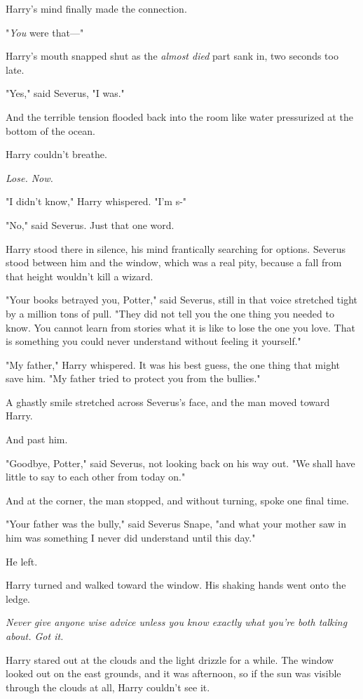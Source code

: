 Harry's mind finally made the connection.

"\emph{You} were that---"

Harry's mouth snapped shut as the \emph{almost died} part sank in, two seconds 
too late.

"Yes," said Severus, "I was."

And the terrible tension flooded back into the room like water pressurized at 
the bottom of the ocean.

Harry couldn't breathe.

\emph{Lose. Now.}

"I didn't know," Harry whispered. "I'm s-"

"No," said Severus. Just that one word.

Harry stood there in silence, his mind frantically searching for options. 
Severus stood between him and the window, which was a real pity, because a fall 
from that height wouldn't kill a wizard.

"Your books betrayed you, Potter," said Severus, still in that voice stretched 
tight by a million tons of pull. "They did not tell you the one thing you 
needed to know. You cannot learn from stories what it is like to lose the one 
you love. That is something you could never understand without feeling it 
yourself."

"My father," Harry whispered. It was his best guess, the one thing that might 
save him. "My father tried to protect you from the bullies."

A ghastly smile stretched across Severus's face, and the man moved toward Harry.

And past him.

"Goodbye, Potter," said Severus, not looking back on his way out. "We shall 
have little to say to each other from today on."

And at the corner, the man stopped, and without turning, spoke one final time.

"Your father was the bully," said Severus Snape, "and what your mother saw in 
him was something I never did understand until this day."

He left.

Harry turned and walked toward the window. His shaking hands went onto the 
ledge.

\emph{Never give anyone wise advice unless you know exactly what you're both 
talking about. Got it.}

Harry stared out at the clouds and the light drizzle for a while. The window 
looked out on the east grounds, and it was afternoon, so if the sun was visible 
through the clouds at all, Harry couldn't see it.

